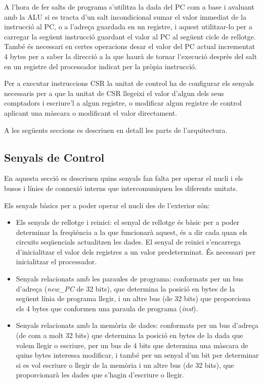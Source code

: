 \documentclass[10pt,a4paper,twocolumn,twoside]{article}
\begin{document}
    A l'hora de fer salts de programa s'utilitza la dada del PC com a base i avaluant amb la ALU si es tracta d'un salt incondicional sumar el valor immediat de la instrucció al PC, o a l'adreça guardada en un registre, i aquest utilitzar-lo per a carregar la següent instrucció guardant el valor al PC al següent cicle de rellotge. També és necessari en certes operacions desar el valor del PC actual incrementat 4 bytes per a saber la direcció a la que haurà de tornar l'execució desprès del salt en un registre del processador indicat per la pròpia instrucció.
    
    Per a executar instruccions CSR la unitat de control ha de configurar els senyals necessaris per a que la unitat de CSR llegeixi el valor d'algun dels seus comptadors i escriure'l a algun registre, o modificar algun registre de control aplicant una màscara o modificant el valor directament.
    
    A les següents seccions es descriuen en detall les parts de l'arquitectura.
    \subsection{Senyals de Control}
    En aquesta secció es descriuen quins senyals fan falta per operar el nucli i els busos i línies de connexió interns que intercomuniquen les diferents unitats.
        
        Els senyals bàsics per a poder operar el nucli des de l'exterior són:
        \begin{itemize}
            \item Els senyals de rellotge i reinici: el senyal de rellotge és bàsic per a poder determinar la freqüència a la que funcionarà aquest, és a dir cada quan els circuits seqüencials actualitzen les dades. El senyal de reinici s’encarrega d’inicialitzar el valor dels registres a un valor predeterminat. És necessari per inicialitzar el processador. 
            \item Senyals relacionats amb les paraules de programa: conformats per un bus d'adreça (\textit{new\_PC} de 32 bits), que determina la posició en bytes de la següent línia de programa llegir, i un altre bus (de 32 bits) que proporciona els 4 bytes que conformen una paraula de programa (\textit{inst}).
            \item Senyals relacionats amb la memòria de dades: conformats per un bus d'adreça (de com a molt 32 bits) que determina la posició en bytes de la dada que volem llegir o escriure, per un bus de 4 bits que determina una màscara de quins bytes interessa modificar, i també per un senyal d'un bit per determinar si es vol escriure o llegir de la memòria i un altre bus (de 32 bits), que proporcionarà les dades que s'hagin d'escriure o llegir.
        \end{itemize}
        
\end{document}
